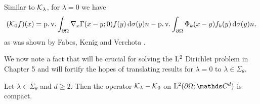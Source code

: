 Similar to $\mathcal{K}_\lambda$, for $\lambda = 0$ we have
\begin{align}
  \label{eq:defnK0}
    (\mathcal{K}_0 f)(x)= \operatorname{p. v.} \int_{\partial\Omega} \nabla_x \Gamma(x - y; 0)  f(y) \, {\operatorname{d}\!{\sigma}}(y) n - \operatorname{p. v.} \int_{\partial\Omega} \Phi_k(x - y) f_k(y) \, {\operatorname{d}\!{\sigma}}(y) n,
\end{align}
as was shown by Fabes, Kenig and Verchota \cite[(0.12)]{fabesKenigVerchota}.

We now note a fact that will be crucial for solving the $\mathrm{L}^2$ Dirichlet problem in Chapter 5 and will fortify the hopes of translating results for $\lambda = 0$ to $\lambda \in \Sigma_\theta$.
\begin{lem}
  \label{lem:compactness}
  Let $\lambda \in \Sigma_\theta$ and $d \geq 2$.
  Then the operator $\mathcal{K}_\lambda - \mathcal{K}_0$ on $\Ell^2(\partial\Omega; \C^d)$ is compact.
\end{lem}

